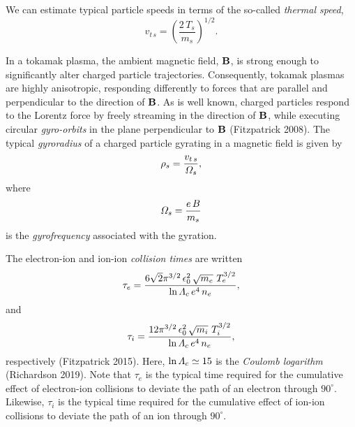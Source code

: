 \documentclass[notitlepage,12pt]{article}
\begin{document}
We can
estimate typical particle speeds in terms of the so-called {\em thermal speed}, 
\begin{equation}\label{e1.3}
v_{t\,s} = \left(\frac{2\,T_s}{m_s}\right)^{1/2}.
\end{equation}

In a tokamak plasma,  the ambient magnetic field, 
${\bf B}$,  is strong enough to significantly alter charged particle
trajectories. Consequently,
tokamak plasmas are highly  anisotropic, responding differently to
forces that are parallel and perpendicular to the direction
of ${\bf B}$. As is well known, charged particles respond to the Lorentz force
by freely streaming in the direction of ${\bf B}$, while executing
circular  {\em gyro-orbits} in the plane perpendicular to ${\bf B}$ (Fitzpatrick 2008). 
The typical   {\em gyroradius}\/ of a charged particle 
gyrating in a
magnetic field is given by
\begin{equation}
\rho_s = \frac{v_{t\,s}}{{\mit\Omega}_s},
\end{equation}
where
\begin{equation}
{\mit\Omega}_s = \frac{e\,B}{m_s}
\end{equation}
is the  {\em gyrofrequency}\/ associated with the
gyration. 

The electron-ion and ion-ion {\em collision times}\/ are
written
\begin{equation}\label{e3.74}
\tau_e = \frac{6\sqrt{2}\pi^{3/2}\,\epsilon_0^{2}\,\sqrt{m_e}\,\,T_e^{3/2}}
{\ln{\mit\Lambda}_c\, e^4\, n_e},
\end{equation}
and
\begin{equation}\label{e3.75}
\tau_i = \frac{ 12\pi^{3/2}\,\epsilon_0^{2}\,\sqrt{m_i}\,\,T_i^{3/2}}
{\ln{\mit\Lambda}_c\, e^4\, n_e},
\end{equation}
respectively (Fitzpatrick 2015). 
Here, $\ln{\mit\Lambda}_c\simeq 15$ is 
the  {\em Coulomb logarithm}\/ (Richardson 2019). Note that $\tau_e$ is the typical time required for the cumulative effect of electron-ion collisions to
deviate the path of an electron through $90^\circ$. Likewise, $\tau_i$ is the typical time required for the cumulative effect of ion-ion collisions to
deviate the path of an ion through $90^\circ$. 
\end{document}

